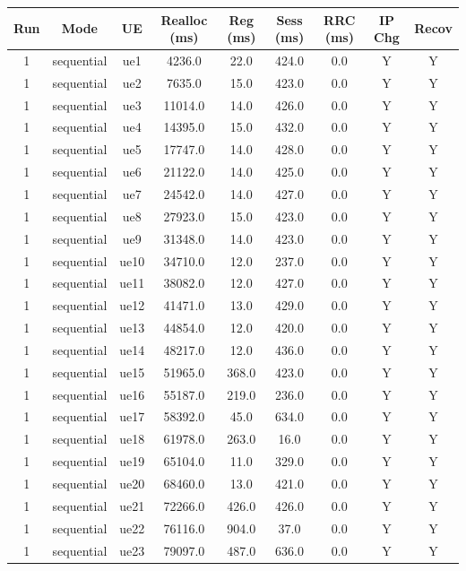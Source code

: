 \begin{table}[ht]
\centering
\begin{tabular}{|c|c|c|c|c|c|c|c|c|}
\hline
Run & Mode & UE & Realloc (ms) & Reg (ms) & Sess (ms) & RRC (ms) & IP Chg & Recov \\
\hline
1 & sequential & ue1 & 4236.0 & 22.0 & 424.0 & 0.0 & Y & Y \\
1 & sequential & ue2 & 7635.0 & 15.0 & 423.0 & 0.0 & Y & Y \\
1 & sequential & ue3 & 11014.0 & 14.0 & 426.0 & 0.0 & Y & Y \\
1 & sequential & ue4 & 14395.0 & 15.0 & 432.0 & 0.0 & Y & Y \\
1 & sequential & ue5 & 17747.0 & 14.0 & 428.0 & 0.0 & Y & Y \\
1 & sequential & ue6 & 21122.0 & 14.0 & 425.0 & 0.0 & Y & Y \\
1 & sequential & ue7 & 24542.0 & 14.0 & 427.0 & 0.0 & Y & Y \\
1 & sequential & ue8 & 27923.0 & 15.0 & 423.0 & 0.0 & Y & Y \\
1 & sequential & ue9 & 31348.0 & 14.0 & 423.0 & 0.0 & Y & Y \\
1 & sequential & ue10 & 34710.0 & 12.0 & 237.0 & 0.0 & Y & Y \\
1 & sequential & ue11 & 38082.0 & 12.0 & 427.0 & 0.0 & Y & Y \\
1 & sequential & ue12 & 41471.0 & 13.0 & 429.0 & 0.0 & Y & Y \\
1 & sequential & ue13 & 44854.0 & 12.0 & 420.0 & 0.0 & Y & Y \\
1 & sequential & ue14 & 48217.0 & 12.0 & 436.0 & 0.0 & Y & Y \\
1 & sequential & ue15 & 51965.0 & 368.0 & 423.0 & 0.0 & Y & Y \\
1 & sequential & ue16 & 55187.0 & 219.0 & 236.0 & 0.0 & Y & Y \\
1 & sequential & ue17 & 58392.0 & 45.0 & 634.0 & 0.0 & Y & Y \\
1 & sequential & ue18 & 61978.0 & 263.0 & 16.0 & 0.0 & Y & Y \\
1 & sequential & ue19 & 65104.0 & 11.0 & 329.0 & 0.0 & Y & Y \\
1 & sequential & ue20 & 68460.0 & 13.0 & 421.0 & 0.0 & Y & Y \\
1 & sequential & ue21 & 72266.0 & 426.0 & 426.0 & 0.0 & Y & Y \\
1 & sequential & ue22 & 76116.0 & 904.0 & 37.0 & 0.0 & Y & Y \\
1 & sequential & ue23 & 79097.0 & 487.0 & 636.0 & 0.0 & Y & Y \\

\end{tabular}
\end{table}
